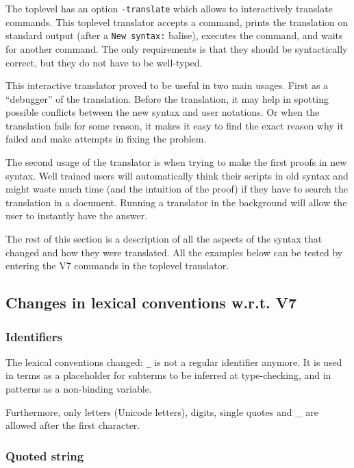 \documentclass[11pt,a4paper]{article}
\def\TERM#1{\texttt{#1}}
\begin{document}
The toplevel has an option {\tt -translate} which allows to
interactively translate commands. This toplevel translator accepts a
command, prints the translation on standard output (after a %
\verb+New syntax:+ balise), executes the command, and waits for another
command. The only requirements is that they should be syntactically
correct, but they do not have to be well-typed.

This interactive translator proved to be useful in two main
usages. First as a ``debugger'' of the translation. Before the
translation, it may help in spotting possible conflicts between the
new syntax and user notations. Or when the translation fails for some
reason, it makes it easy to find the exact reason why it failed and
make attempts in fixing the problem.

The second usage of the translator is when trying to make the first
proofs in new syntax. Well trained users will automatically think
their scripts in old syntax and might waste much time (and the
intuition of the proof) if they have to search the translation in a
document. Running a translator in the background will allow the user
to instantly have the answer.

The rest of this section is a description of all the aspects of the
syntax that changed and how they were translated. All the examples
below can be tested by entering the V7 commands in the toplevel
translator.



\subsection{Changes in lexical conventions w.r.t. V7}

\subsubsection{Identifiers}

The lexical conventions changed: \TERM{_} is not a regular identifier
anymore. It is used in terms as a placeholder for subterms to be inferred
at type-checking, and in patterns as a non-binding variable.

Furthermore, only letters (Unicode letters), digits, single quotes and
_ are allowed after the first character.

\subsubsection{Quoted string}
\end{document}
